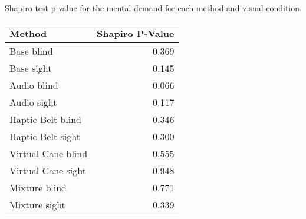 
\centering
\caption{Shapiro test p-value for the mental demand for each method and visual condition.}
\label{tab:shapiro_mental_demand}
\begin{tabular}{lr}
\toprule
            Method &  Shapiro P-Value \\
\midrule
        Base blind &            0.369 \\
        Base sight &            0.145 \\
       Audio blind &            0.066 \\
       Audio sight &            0.117 \\
 Haptic Belt blind &            0.346 \\
 Haptic Belt sight &            0.300 \\
Virtual Cane blind &            0.555 \\
Virtual Cane sight &            0.948 \\
     Mixture blind &            0.771 \\
     Mixture sight &            0.339 \\
\bottomrule
\end{tabular}
